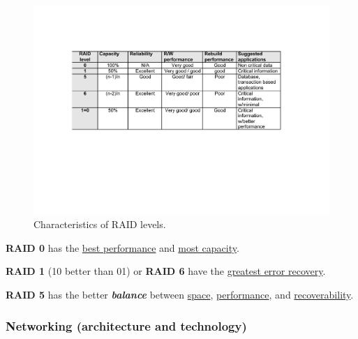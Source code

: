 \newpage

\begin{figure}[!htp]
    \centering
    \includegraphics[width=\textwidth]{img/raid-011.pdf}
    \caption{Characteristics of RAID levels.}
\end{figure}

\noindent
\textbf{RAID 0} has the \underline{best performance} and \underline{most capacity}.

\highspace
\textbf{RAID 1} (10 better than 01) or \textbf{RAID 6} have the \underline{greatest error recovery}.

\highspace
\textbf{RAID 5} has the better \textbf{\emph{balance}} between \underline{space}, \underline{performance}, and \underline{recoverability}.

\newpage

\subsubsection{Networking (architecture and technology)}\label{subsubsection: Networking (architecture and technology)}
